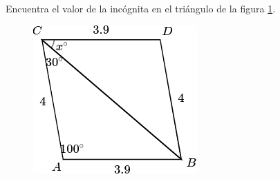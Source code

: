 Encuentra el valor de la incógnita en el triángulo de la figura \ref{fig:angle_triangle_21}.

\begin{minipage}[t][5cm][b]{0.3\textwidth}
    \begin{figure}[H]
        \centering
        \includegraphics[width=0.9\linewidth]{../images/angle_triangle_21.png}

        \caption{}
        \label{fig:angle_triangle_21}
    \end{figure}
\end{minipage}\hfill
\begin{minipage}[t]{0.65\textwidth}
    \begin{solutionbox}{5cm}

    \end{solutionbox}
\end{minipage}
